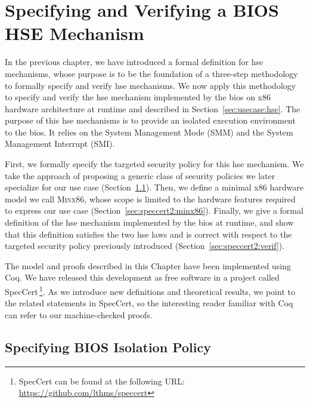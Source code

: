 \chapter{Specifying and Verifying a BIOS HSE Mechanism}
\label{chapter:speccert2}


\vspace{1cm}%
\noindent
%
In the previous chapter, we have introduced a formal definition for \ac{hse}
mechanisms, whose purpose is to be the foundation of a three-step methodology to
formally specify and verify \ac{hse} mechanisms.
%
We now apply this methodology to specify and verify the \ac{hse} mechanism
implemented by the \ac{bios} on x86 hardware architecture at runtime and
described in Section~\ref{sec:usecase:hse}.
%
The purpose of this \ac{hse} mechanisms is to provide an isolated execution
environment to the \ac{bios}. It relies on the System Management Mode (SMM) and
the System Management Interrupt (SMI).

First, we formally specify the targeted security policy for this \ac{hse}
mechanism.
%
We take the approach of proposing a generic class of security policies we later
specialize for our use case (Section~\ref{sec:speccert2:usecase}).
%
Then, we define a minimal x86 hardware model we call {\scshape Minx86}, whose
scope is limited to the hardware features required to express our use case
(Section~\ref{sec:speccert2:minx86}).
%
Finally, we give a formal definition of the \ac{hse} mechanism implemented by
the \ac{bios} at runtime, and show that this definition satisfies the two
\ac{hse} laws and is correct with respect to the targeted security policy
previously introduced (Section~\ref{sec:speccert2:verif}).

The model and proofs described in this Chapter have been implemented using Coq.
%
We have released this development as free software in a project called SpecCert\,\footnote{SpecCert can be found at the following
  URL: \url{https://github.com/lthms/speccert}}.
%
As we introduce new definitions and theoretical results, we point to the related
statements in SpecCert, so the interesting reader familiar with Coq can
refer to our machine-checked proofs.

\section{Specifying BIOS Isolation Policy}
\label{sec:speccert2:usecase}

